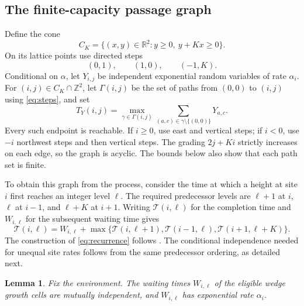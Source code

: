 \documentclass[11pt]{amsart}
\newtheorem{lemma}[theorem]{Lemma}
\theoremstyle{remark}
\newcommand{\ZZ}{\mathbb Z}
\newcommand{\RR}{\mathbb R}
\numberwithin{equation}{section}
\begin{document}
\subsection{The finite-capacity passage graph}
Define the cone
\begin{equation}\label{eq:cone}
 C_K=\{(x,y)\in\RR^2:y\geq0,\ y+Kx\geq0\}.
\end{equation}
On its lattice points use directed steps
\begin{equation}\label{eq:steps}
 (0,1),\qquad (1,0),\qquad (-1,K).
\end{equation}
Conditional on $\alpha$, let $Y_{i,j}$ be independent exponential
random variables of rate $\alpha_i$. For $(i,j)\in C_K\cap\ZZ^2$,
let $\Gamma(i,j)$ be the set of paths from $(0,0)$ to $(i,j)$ using
\eqref{eq:steps}, and set
\begin{equation}\label{eq:passage}
 T_Y(i,j)=\max_{\gamma\in\Gamma(i,j)}
 \sum_{(a,c)\in\gamma\setminus\{(0,0)\}}Y_{a,c}.
\end{equation}
Every such endpoint is reachable. If $i\geq0$, use east and vertical
steps; if $i<0$, use $-i$ northwest steps and then vertical steps.
The grading $2j+Ki$ strictly increases on each edge, so the graph is
acyclic. The bounds below also show that each path set is finite.

To obtain this graph from the process, consider the time at which a
height at site $i$ first reaches an integer level $\ell$. The required
predecessor levels are $\ell+1$ at $i$, $\ell$ at $i-1$, and
$\ell+K$ at $i+1$. Writing $\mathcal T(i,\ell)$ for the completion
time and $W_{i,\ell}$ for the subsequent waiting time gives
\begin{equation}\label{eq:recurrence}
 \mathcal T(i,\ell)=W_{i,\ell}+
 \max\{\mathcal T(i,\ell+1),\mathcal T(i-1,\ell),
                         \mathcal T(i+1,\ell+K)\}.
\end{equation}
The construction of \eqref{eq:recurrence} follows
\cite[Lemma 9.11 and equations (9.40)--(9.44), pp.~148--150]{SeppNotes}.
The conditional independence needed for unequal site rates follows
from the same predecessor ordering, as detailed next.

\begin{lemma}\label{lem:services}
Fix the environment. The waiting times $W_{i,\ell}$ of the eligible
wedge growth cells are mutually independent, and $W_{i,\ell}$ has
exponential rate $\alpha_i$.
\end{lemma}
\end{document}
